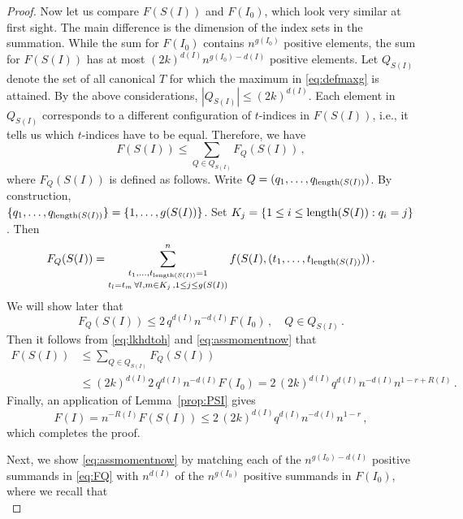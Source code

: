 \begin{proof}
Now let us compare $F(S(I))$ and $F(I_0)$, which look very similar at first sight. The main difference is the dimension of the index sets in the summation. While the sum for $F(I_0)$ contains $n^{g(I_0)}$ positive elements, the sum for $F(S(I))$ has at most $(2k)^{d(I)} n^{g(I_0)-d(I)}$ positive elements. Let $Q_{S(I)}$ denote the set of all canonical $T$ for which the maximum in \eqref{eq:defmaxg} is attained. By the above considerations, $| Q_{S(I)}| \le (2k)^{d(I)}$. Each element in $Q_{S(I)}$ corresponds to a different configuration of $t$-indices in $F(S(I))$, i.e., it tells us which $t$-indices have to be equal. Therefore, we have
\begin{equation}\label{eq:lkhdtoh}
F(S(I))\le \sum_{Q\in Q_{S(I)}} F_Q(S(I))\,,
\end{equation} 
where $F_Q(S(I))$ is defined as follows. Write $Q=(q_1,\ldots, q_{\operatorname{length}(S(I))})$. By construction,\\
 $\{ q_1,\ldots, q_{\operatorname{length}(S(I))}\} = \{1,\ldots, g(S(I))\}$. Set $K_j=\{ 1\le i\le \operatorname{length}(S(I)) :  q_i=j\}$. Then 
\begin{equation}\label{eq:FQ}
F_Q(S(I))= \mathop{\sum_{t_1,\ldots,t_{\operatorname{length}(S(I))}=1}}_{t_l=t_m \, \forall l,m \in K_j\,, 1\le j\le g(S(I))}^n f(S(I),(t_1, \ldots,t_{\operatorname{length}(S(I))}))\,.
\end{equation}
We will show later that 
\begin{equation}\label{eq:assmomentnow}
F_Q(S(I)) \le 2\, q^{d(I)} n^{-d(I)} F(I_0)\,, \quad Q\in Q_{S(I)}\,.
\end{equation}
Then it follows from \eqref{eq:lkhdtoh} and \eqref{eq:assmomentnow} that
\begin{equation*}
\begin{split}
F(S(I))&\le \sum_{Q\in Q_{S(I)}} F_Q(S(I))\\
&\le (2k)^{d(I)} 2\, q^{d(I)} n^{-d(I)} F(I_0) = 2\, (2k)^{d(I)} q^{d(I)} n^{-d(I)} n^{1-r+R(I)}\,.
\end{split}
\end{equation*}
Finally, an application of Lemma~\ref{prop:PSI} gives 
\begin{equation*}
F(I) =n^{-R(I)}F(S(I))\le 2\, (2k)^{d(I)} q^{d(I)} n^{-d(I)} n^{1-r}\,,
\end{equation*}
which completes the proof. 
\par
Next, we show \eqref{eq:assmomentnow} by matching each of the $n^{g(I_0)-d(I)}$ positive summands in \eqref{eq:FQ} with $n^{d(I)}$ of the $n^{g(I_0)}$ positive summands in $F(I_0)$, where we recall that
\begin{equation}\label{eq:FI0}

\end{equation}
\end{proof}
